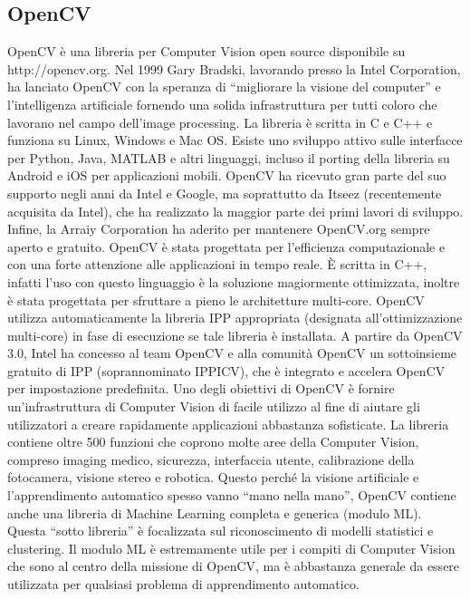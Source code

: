 \documentclass[twoside]{supsistudent}
\begin{document}
\subsection{OpenCV}
OpenCV è una libreria per Computer Vision open source disponibile su http://opencv.org. 
Nel 1999 Gary Bradski, lavorando presso la Intel Corporation, ha lanciato OpenCV con la speranza 
di “migliorare la visione del computer” e l’intelligenza artificiale fornendo una solida 
infrastruttura per tutti coloro che lavorano nel campo dell’image processing. La libreria è 
scritta in C e C++ e funziona su Linux, Windows e Mac OS. Esiste uno sviluppo attivo sulle 
interfacce per Python, Java, MATLAB e altri linguaggi, incluso il porting della libreria su 
Android e iOS per applicazioni mobili. OpenCV ha ricevuto gran parte del suo supporto negli 
anni da Intel e Google, ma soprattutto da Itseez (recentemente acquisita da Intel), che ha 
realizzato la maggior parte dei primi lavori di sviluppo. Infine, la Arraiy Corporation ha aderito per 
mantenere OpenCV.org sempre aperto e gratuito. OpenCV è stata progettata per l'efficienza
computazionale e con una forte attenzione alle applicazioni in tempo reale. È scritta in 
C++, infatti l'uso con questo linguaggio è la soluzione magiormente ottimizzata, inoltre è stata progettata per 
sfruttare a pieno le architetture multi-core. OpenCV utilizza automaticamente la libreria 
IPP appropriata (designata all’ottimizzazione multi-core) in fase di esecuzione se tale 
libreria è installata. A partire da OpenCV 3.0, Intel ha concesso al team OpenCV e alla 
comunità OpenCV un sottoinsieme gratuito di IPP (soprannominato IPPICV), che è integrato e 
accelera OpenCV per impostazione predefinita. Uno degli obiettivi di OpenCV è fornire 
un'infrastruttura di Computer Vision di facile utilizzo al fine di aiutare gli utilizzatori 
a creare rapidamente applicazioni abbastanza sofisticate. La libreria contiene 
oltre 500 funzioni che coprono molte aree della Computer Vision, compreso imaging medico, 
sicurezza, interfaccia utente, calibrazione della fotocamera, visione stereo e robotica. 
Questo perché la visione artificiale e l'apprendimento automatico spesso vanno “mano nella 
mano”, OpenCV contiene anche una libreria di Machine Learning completa e generica (modulo ML). 
Questa “sotto libreria” è focalizzata sul riconoscimento di modelli statistici e clustering. 
Il modulo ML è estremamente utile per i compiti di Computer Vision che sono al centro della missione 
di OpenCV, ma è abbastanza generale da essere utilizzata per qualsiasi problema di 
apprendimento automatico.
\end{document}
